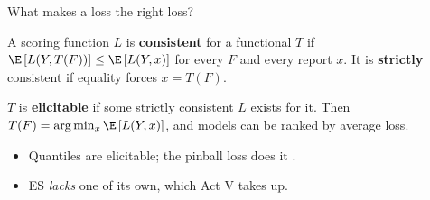 \documentclass[9pt, aspectratio=169, t]{beamer}
\begin{document}
\begin{frame}{What makes a loss the right loss?}
  \hypertarget{ap:loss}{}%
  \hfill\hyperlink{main:backtest}{}\par\vspace{-0.6em}
  \begin{defn}[Consistency]
    A scoring function $L$ is \textbf{consistent} for a functional $T$ if
    $\E\left[L(Y, T(F))\right] \le \E\left[L(Y, x)\right]$ for every $F$ and every
    report $x$. It is \textbf{strictly} consistent if equality forces $x = T(F)$.
  \end{defn}
  \vspace{0.3em}
  \begin{defn}[Elicitability]
    $T$ is \textbf{elicitable} if some strictly consistent $L$ exists for it. Then
    $T(F) = \arg\min_{x} \E\left[L(Y, x)\right]$, and models can be ranked by average
    loss.
  \end{defn}
  \vspace{0.4em}
  \begin{itemize}
    \item Quantiles are elicitable; the pinball loss does it \parencite{gneiting2011point}.
    \item ES \emph{lacks} one of its own, which Act V takes up.
  \end{itemize}
\end{frame}
\end{document}
